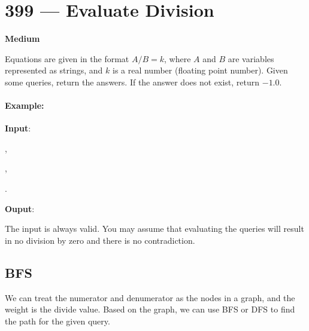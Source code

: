 \section{399 --- Evaluate Division}

\textbf{Medium}

Equations are given in the format $A / B = k$, where $A$ and $B$ are variables represented as strings, and $k$ is a real number (floating point number). Given some queries, return the answers. If the answer does not exist, return $-1.0$.

\paragraph{Example:}

\textbf{Input}:

\begin{flushleft}
,

,

. 

\textbf{Ouput}: \fcj{[6.0, 0.5, -1.0, 1.0, -1.0 ]}

\end{flushleft} 

The input is always valid. You may assume that evaluating the queries will result in no division by zero and there is no contradiction.

\subsection{BFS}
We can treat the numerator and denumerator as the nodes in a graph, and the weight is the divide value. Based on the graph, we can use BFS or DFS to find the path for the given query.

